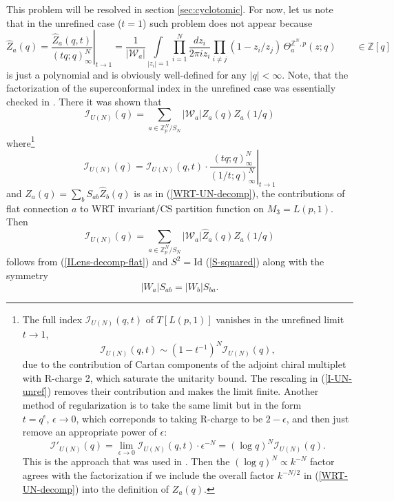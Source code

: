 \documentclass[hyper,letterpaper]{JHEP3}
\newcommand{\be}{\begin{equation}}
\newcommand{\ee}{\end{equation}}
\newcommand{\Z}{{\mathbb Z}}
\renewcommand{\hat}{\widehat}
\def\CI{{\mathcal I}}
\def\CW{{\mathcal W}}
\begin{document}
This problem will be resolved in section \ref{sec:cyclotomic}. For now, let us note that in the unrefined case ($t=1$) such problem does not appear because
\begin{equation}
	\hat{Z}_a(q)=\left.\frac{\hat{Z}_a(q,t)}{(tq;q)_\infty^N}\right|_{t\rightarrow 1}
=
\frac{1}{|\CW_a|}\int\limits_{|z_i|=1} \prod_{i=1}^N \frac{dz_i}{2\pi i z_i}
	\prod_{i\neq j}(1-z_i/z_j)
	\,\Theta_{a}^{\mathbb{Z}^N,p}(z;q)\qquad \in \Z[q]
\end{equation}
is just a polynomial and is obviously well-defined for any $|q|<\infty$. Note, that the factorization of the superconformal index in the unrefined case was essentially checked in \cite{appetizer}. There it was shown that
\begin{equation}
 \CI_{U(N)}(q)=\sum_{a\in \Z_p^N/S_N} |\CW_a|{Z}_a(q){Z}_a(1/q)
\label{ILens-decomp-flat}
\end{equation}
where\footnote{The full index $\CI_{U(N)}(q,t)$ of $T[L(p,1)]$ vanishes in the unrefined limit $t\rightarrow 1$,
\be
\CI_{U(N)}(q,t)\sim (1-t^{-1})^N \CI_{U(N)}(q),
\ee
due to the contribution of Cartan components of the adjoint chiral multiplet with R-charge 2, which saturate the unitarity bound. The rescaling in (\ref{I-UN-unref}) removes their contribution and makes the limit finite. Another method of regularization is to take the same limit but in the form $t=q^\epsilon,\,\epsilon\rightarrow 0$, which correponds to taking R-charge to be $2-\epsilon$, and then just remove an appropriate power of $\epsilon$:
\begin{equation}
 \CI'_{U(N)}(q)=\lim_{\epsilon\rightarrow 0} \CI_{U(N)}(q,t)\cdot \epsilon^{-N}=(\log q)^N \CI_{U(N)}(q).
\end{equation}
This is the approach that was used in \cite{appetizer}. Then the $(\log q)^N\propto k^{-N}$ factor agrees with the factorization if we include the overall factor $k^{-N/2}$ in (\ref{WRT-UN-decomp}) into the definition of $Z_a(q)$.
 }
\begin{equation}
 \CI_{U(N)}(q)=\left. \CI_{U(N)}(q,t)\cdot \frac{(tq;q)_\infty^N}{(1/t;q)_\infty^N} \right|_{t\rightarrow 1}
\label{I-UN-unref}
\end{equation}
and $Z_a(q)=\sum_b S_{ab}\hat{Z}_b(q)$ is as in (\ref{WRT-UN-decomp}), the contributions of flat connection $a$ to WRT invariant/CS partition function on $M_3=L(p,1)$. Then
\begin{equation}
  \CI_{U(N)}(q)=\sum_{a\in \Z_p^N/S_N} |\CW_a|\hat{Z}_a(q)\hat{Z}_a(1/q)
\end{equation}
follows from (\ref{ILens-decomp-flat}) and $S^2=\text{Id}$ (\ref{S-squared}) along with the symmetry
\be
|W_a|S_{ab}=|W_b|S_{ba}.
\ee
\end{document}
